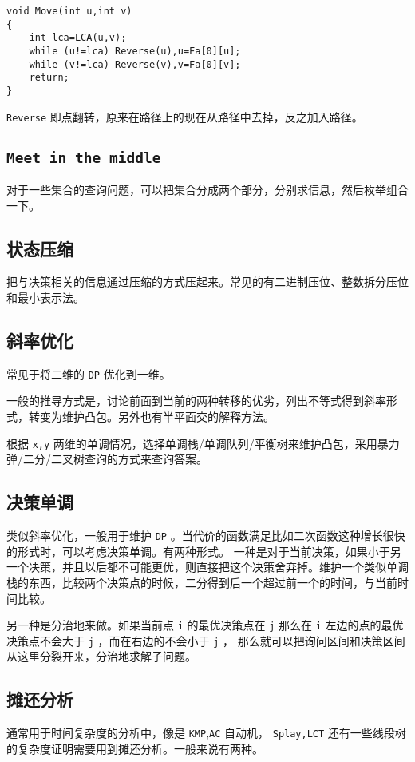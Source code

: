 \documentclass[UTF-8]{ctexart}
\begin{document}
\begin{verbatim}
void Move(int u,int v)
{
    int lca=LCA(u,v);
    while (u!=lca) Reverse(u),u=Fa[0][u];
    while (v!=lca) Reverse(v),v=Fa[0][v];
    return;
}
\end{verbatim}
	\texttt{Reverse} 即点翻转，原来在路径上的现在从路径中去掉，反之加入路径。
	
	\subsection{\texttt{Meet in the middle}}
	对于一些集合的查询问题，可以把集合分成两个部分，分别求信息，然后枚举组合一下。
	
	\subsection{状态压缩}
	把与决策相关的信息通过压缩的方式压起来。常见的有二进制压位、整数拆分压位和最小表示法。
	
	\subsection{斜率优化}
	常见于将二维的 \texttt{DP} 优化到一维。
	
	一般的推导方式是，讨论前面到当前的两种转移的优劣，列出不等式得到斜率形式，转变为维护凸包。另外也有半平面交的解释方法。
	
	根据 \texttt{x,y} 两维的单调情况，选择单调栈/单调队列/平衡树来维护凸包，采用暴力弹/二分/二叉树查询的方式来查询答案。
	
	\subsection{决策单调}
	类似斜率优化，一般用于维护 \texttt{DP} 。当代价的函数满足比如二次函数这种增长很快的形式时，可以考虑决策单调。有两种形式。
	一种是对于当前决策，如果小于另一个决策，并且以后都不可能更优，则直接把这个决策舍弃掉。维护一个类似单调栈的东西，比较两个决策点的时候，二分得到后一个超过前一个的时间，与当前时间比较。
	
	另一种是分治地来做。如果当前点 \texttt{i} 的最优决策点在 \texttt{j} 那么在 \texttt{i} 左边的点的最优决策点不会大于 \texttt{j} ，而在右边的不会小于 \texttt{j} ， 那么就可以把询问区间和决策区间从这里分裂开来，分治地求解子问题。
	
	\subsection{摊还分析}
	通常用于时间复杂度的分析中，像是 \texttt{KMP},\texttt{AC} 自动机， \texttt{Splay,LCT} 还有一些线段树的复杂度证明需要用到摊还分析。一般来说有两种。
	
\end{document}
